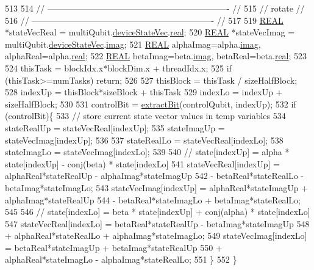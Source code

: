 \begin{DoxyCode}
513 
514     \textcolor{comment}{// ---------------------------------------------------------------- //}
515     \textcolor{comment}{//            rotate                                                //}
516     \textcolor{comment}{// ---------------------------------------------------------------- //}
517 
519     \mbox{\hyperlink{QuEST__precision_8h_a4b654506f18b8bfd61ad2a29a7e38c25}{REAL}} *stateVecReal = multiQubit.\mbox{\hyperlink{structMultiQubit_a59ac613486a41b8c9a4b6e79cc8d2cc3}{deviceStateVec}}.\mbox{\hyperlink{structComplexArray_a4195cac6c784ea1b6271f1c7dba1548a}{real}};
520     \mbox{\hyperlink{QuEST__precision_8h_a4b654506f18b8bfd61ad2a29a7e38c25}{REAL}} *stateVecImag = multiQubit.\mbox{\hyperlink{structMultiQubit_a59ac613486a41b8c9a4b6e79cc8d2cc3}{deviceStateVec}}.\mbox{\hyperlink{structComplexArray_a79dde47c7ae530c79cebfdf57b225968}{imag}};
521     \mbox{\hyperlink{QuEST__precision_8h_a4b654506f18b8bfd61ad2a29a7e38c25}{REAL}} alphaImag=alpha.\mbox{\hyperlink{structComplex_a1151948284b21c0052f203f23ab931d9}{imag}}, alphaReal=alpha.\mbox{\hyperlink{structComplex_a479ad939835457595fcca3ca55c06283}{real}};
522     \mbox{\hyperlink{QuEST__precision_8h_a4b654506f18b8bfd61ad2a29a7e38c25}{REAL}} betaImag=beta.\mbox{\hyperlink{structComplex_a1151948284b21c0052f203f23ab931d9}{imag}}, betaReal=beta.\mbox{\hyperlink{structComplex_a479ad939835457595fcca3ca55c06283}{real}};
523 
524     thisTask = blockIdx.x*blockDim.x + threadIdx.x;
525     \textcolor{keywordflow}{if} (thisTask>=numTasks) \textcolor{keywordflow}{return};
526 
527     thisBlock   = thisTask / sizeHalfBlock;
528     indexUp     = thisBlock*sizeBlock + thisTask%
529     indexLo     = indexUp + sizeHalfBlock;
530 
531     controlBit = \mbox{\hyperlink{QuEST__env__localGPU_8cu_a6ffa51987d8ad8f6c0fc07fd3492277f}{extractBit}}(controlQubit, indexUp);
532     \textcolor{keywordflow}{if} (controlBit)\{
533         \textcolor{comment}{// store current state vector values in temp variables}
534         stateRealUp = stateVecReal[indexUp];
535         stateImagUp = stateVecImag[indexUp];
536 
537         stateRealLo = stateVecReal[indexLo];
538         stateImagLo = stateVecImag[indexLo];
539 
540         \textcolor{comment}{// state[indexUp] = alpha * state[indexUp] - conj(beta)  * state[indexLo]}
541         stateVecReal[indexUp] = alphaReal*stateRealUp - alphaImag*stateImagUp 
542             - betaReal*stateRealLo - betaImag*stateImagLo;
543         stateVecImag[indexUp] = alphaReal*stateImagUp + alphaImag*stateRealUp 
544             - betaReal*stateImagLo + betaImag*stateRealLo;
545 
546         \textcolor{comment}{// state[indexLo] = beta  * state[indexUp] + conj(alpha) * state[indexLo]}
547         stateVecReal[indexLo] = betaReal*stateRealUp - betaImag*stateImagUp 
548             + alphaReal*stateRealLo + alphaImag*stateImagLo;
549         stateVecImag[indexLo] = betaReal*stateImagUp + betaImag*stateRealUp 
550             + alphaReal*stateImagLo - alphaImag*stateRealLo;
551     \}
552 \}
\end{DoxyCode}
